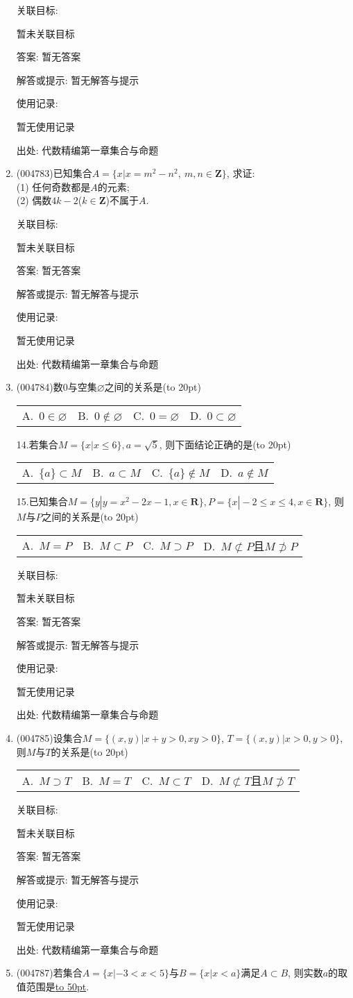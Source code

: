 \documentclass[10pt,a4paper]{article}
\newcommand{\blank}[1]{\underline{\hbox to #1pt{}}}
\newcommand{\bracket}[1]{(\hbox to #1pt{})}
\newcommand{\fourch}[4]{\par\begin{tabular}{p{.23\textwidth}p{.23\textwidth}p{.23\textwidth}p{.23\textwidth}}
A.~#1 &B.~#2& C.~#3& D.~#4
\end{tabular}}
\begin{document}
\begin{enumerate}[1.]
关联目标:

暂未关联目标

答案: 暂无答案

解答或提示: 暂无解答与提示

使用记录:

暂无使用记录


出处: 代数精编第一章集合与命题
\item { (004783)}已知集合$A=\{x|x=m^2-n^2, \ m,n\in \mathbf{Z}\}$, 求证:\\
(1) 任何奇数都是$A$的元素;\\
(2) 偶数$4k-2$($k\in \mathbf{Z}$)不属于$A$.


关联目标:

暂未关联目标

答案: 暂无答案

解答或提示: 暂无解答与提示

使用记录:

暂无使用记录


出处: 代数精编第一章集合与命题
\item { (004784)}数0与空集$\varnothing$之间的关系是\bracket{20}
\fourch{$0\in \varnothing$}{$0\notin \varnothing$}{$0=\varnothing$}{$0\subset \varnothing$}14.若集合$M=\{x |x\le 6\},a=\sqrt 5$, 则下面结论正确的是\bracket{20}
\fourch{$\{ a\}\subset M$}{$a\subset M$}{$\{ a\}\notin M$}{$a\notin M$}15.已知集合$M=\{y |y=x^2-2x-1,x\in \mathbf{R}\},P=\{x |-2\le x\le 4,x\in \mathbf{R}\}$, 则$M$与$P$之间的关系是\bracket{20}
\fourch{$M=P$}{$M\subset P$}{$M\supset P$}{$M\not\subset P$且$M\not\supset P$}


关联目标:

暂未关联目标

答案: 暂无答案

解答或提示: 暂无解答与提示

使用记录:

暂无使用记录


出处: 代数精编第一章集合与命题
\item { (004785)}设集合$M=\{ (x,y)| x+y>0,xy>0 \}$, $T=\{ (x,y)| x>0,y>0 \}$, 则$M$与$T$的关系是\bracket{20}
\fourch{$M\supset T$}{$M=T$}{$M\subset T$}{$M\not\subset T$且$M\not\supset T$}


关联目标:

暂未关联目标

答案: 暂无答案

解答或提示: 暂无解答与提示

使用记录:

暂无使用记录


出处: 代数精编第一章集合与命题
\item { (004787)}若集合$A=\{x|-3<x<5\}$与$B=\{x|x<a\}$满足$A\subset B$, 则实数$a$的取值范围是\blank{50}.



\end{enumerate}
\end{document}
